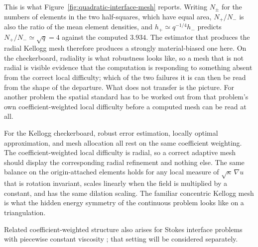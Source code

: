 \documentclass[10pt,pdftex]{amsart}%
\numberwithin{equation}{section}
\begin{document}
This is what Figure~\ref{fig:quadratic-interface-mesh} reports.  Writing $N_\pm$ for the numbers of elements in the two half-squares, which have equal area, $N_+/N_-$ is also the ratio of the mean element densities, and $h_+\simeq q^{-1/4}h_-$ predicts $N_+/N_-\simeq\sqrt q=4$ against the computed $3.934$.  The estimator that produces the radial Kellogg mesh therefore produces a strongly material-biased one here.  On the checkerboard, radiality is what robustness looks like, so a mesh that is not radial is visible evidence that the computation is responding to something absent from the correct local difficulty; which of the two failures it is can then be read from the shape of the departure.  What does not transfer is the picture.  For another problem the spatial standard has to be worked out from that problem's own coefficient-weighted local difficulty before a computed mesh can be read at all.


For the Kellogg checkerboard, robust error estimation, locally optimal approximation, and mesh allocation all rest on the same coefficient weighting.  The coefficient-weighted local difficulty is radial, so a correct adaptive mesh should display the corresponding radial refinement and nothing else.  The same balance on the origin-attached elements holds for any local measure of $\sqrt\kappa\,\nabla u$ that is rotation invariant, scales linearly when the field is multiplied by a constant, and has the same dilation scaling.  The familiar concentric Kellogg mesh is what the hidden energy symmetry of the continuous problem looks like on a triangulation.

Related coefficient-weighted structure also arises for Stokes interface problems with piecewise constant viscosity \cite{LZ26}; that setting will be considered separately.
\end{document}
